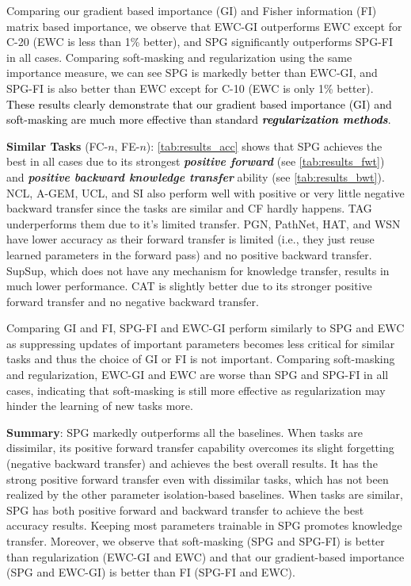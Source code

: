 Comparing our gradient based importance (GI) and Fisher information (FI) matrix based importance, we observe that EWC-GI outperforms EWC except for C-20 (EWC is less than 1\% better), and SPG significantly outperforms SPG-FI in all cases. 
Comparing soft-masking and regularization using the same importance measure, we can see SPG is markedly better than EWC-GI, and SPG-FI is also better than EWC except for C-10 (EWC is only 1\% better).
\textcolor{black}{
These results clearly demonstrate that our gradient based importance (GI) and soft-masking are much more effective than standard \textit{\textbf{regularization methods}}.
}







\textbf{Similar Tasks} (FC-$n$, FE-$n$):
\cref{tab:results_acc} shows that SPG achieves the best in all cases due to its strongest \textit{\textbf{positive forward}} (see \cref{tab:results_fwt}) and \textit{\textbf{positive backward knowledge transfer}} ability (see \cref{tab:results_bwt}).
NCL, A-GEM, UCL, and SI also perform well with positive or very little negative backward transfer since the tasks are similar and CF hardly happens.
TAG underperforms them due to it's limited transfer.
PGN, PathNet, HAT, and WSN
have lower accuracy as their forward transfer is limited (i.e., they just reuse learned parameters in the forward pass) and no positive backward transfer.
SupSup, which does not have any mechanism for knowledge transfer, results in much lower performance.
CAT is slightly better due to its stronger positive forward transfer and no negative backward transfer.

Comparing GI and FI, SPG-FI and EWC-GI perform similarly to SPG and EWC as suppressing updates of important parameters becomes less critical for similar tasks and thus the choice of GI or FI is not important.
Comparing soft-masking and regularization, EWC-GI and EWC are worse than SPG and SPG-FI in all cases, indicating that soft-masking is still more effective as regularization may hinder the learning of new tasks more.




\textbf{Summary}:
SPG markedly outperforms all the baselines. 
When tasks are dissimilar, its positive forward transfer capability overcomes its slight forgetting (negative backward transfer) and achieves the best overall results. It has the strong positive forward transfer even with dissimilar tasks, which has not been realized by the other parameter isolation-based baselines.
When tasks are similar, SPG has both positive forward and backward transfer to achieve the best accuracy results. Keeping most parameters trainable in SPG promotes knowledge transfer. Moreover, we observe that soft-masking (SPG and SPG-FI) is better than regularization (EWC-GI and EWC) and that our gradient-based importance (SPG and EWC-GI) is better than FI (SPG-FI and EWC).









